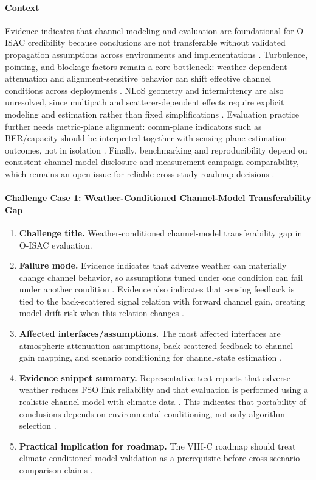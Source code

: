 \paragraph{Context}
Evidence indicates that channel modeling and evaluation are foundational for O-ISAC credibility because conclusions are not transferable without validated propagation assumptions across environments and implementations \cite{O_ISAC_005, O_ISAC_327}. Turbulence, pointing, and blockage factors remain a core bottleneck: weather-dependent attenuation and alignment-sensitive behavior can shift effective channel conditions across deployments \cite{O_ISAC_005, O_ISAC_327}. NLoS geometry and intermittency are also unresolved, since multipath and scatterer-dependent effects require explicit modeling and estimation rather than fixed simplifications \cite{O_ISAC_050}. Evaluation practice further needs metric-plane alignment: comm-plane indicators such as BER/capacity should be interpreted together with sensing-plane estimation outcomes, not in isolation \cite{O_ISAC_381, O_ISAC_050}. Finally, benchmarking and reproducibility depend on consistent channel-model disclosure and measurement-campaign comparability, which remains an open issue for reliable cross-study roadmap decisions \cite{O_ISAC_327}.

\paragraph{Challenge Case 1: Weather-Conditioned Channel-Model Transferability Gap}
\begin{enumerate}
    \item \textbf{Challenge title.} Weather-conditioned channel-model transferability gap in O-ISAC evaluation.
    \item \textbf{Failure mode.} Evidence indicates that adverse weather can materially change channel behavior, so assumptions tuned under one condition can fail under another condition \cite{O_ISAC_005}. Evidence also indicates that sensing feedback is tied to the back-scattered signal relation with forward channel gain, creating model drift risk when this relation changes \cite{O_ISAC_005}.
    \item \textbf{Affected interfaces/assumptions.} The most affected interfaces are atmospheric attenuation assumptions, back-scattered-feedback-to-channel-gain mapping, and scenario conditioning for channel-state estimation \cite{O_ISAC_005}.
    \item \textbf{Evidence snippet summary.} Representative text reports that adverse weather reduces FSO link reliability and that evaluation is performed using a realistic channel model with climatic data \cite{O_ISAC_005}. This indicates that portability of conclusions depends on environmental conditioning, not only algorithm selection \cite{O_ISAC_005}.
    \item \textbf{Practical implication for roadmap.} The VIII-C roadmap should treat climate-conditioned model validation as a prerequisite before cross-scenario comparison claims \cite{O_ISAC_005}.
\end{enumerate}

